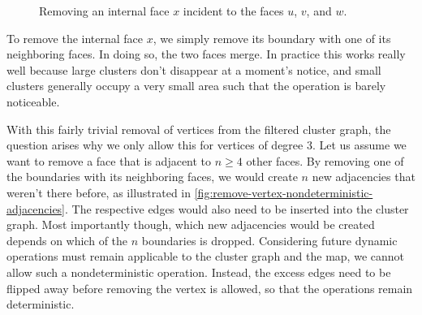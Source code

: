 \begin{figure}[H]
	\centering
	\quad
	\caption{Removing an internal face $x$ incident to the faces $u$, $v$, and $w$.}
	\label{fig:remove-vertex-illustration}
\end{figure}

To remove the internal face $x$, we simply remove its boundary with one of its neighboring faces.
In doing so, the two faces merge.
In practice this works really well because large clusters don't disappear at a moment's notice, and small clusters generally occupy a very small area such that the operation is barely noticeable.

With this fairly trivial removal of vertices from the filtered cluster graph, the question arises why we only allow this for vertices of degree 3.
Let us assume we want to remove a face that is adjacent to $n \geq 4$ other faces.
By removing one of the boundaries with its neighboring faces, we would create $n$ new adjacencies that weren't there before, as illustrated in \cref{fig:remove-vertex-nondeterministic-adjacencies}.
The respective edges would also need to be inserted into the cluster graph.
Most importantly though, which new adjacencies would be created depends on which of the $n$ boundaries is dropped.
Considering future dynamic operations must remain applicable to the cluster graph and the map, we cannot allow such a nondeterministic operation.
Instead, the excess edges need to be flipped away before removing the vertex is allowed, so that the operations remain deterministic.

